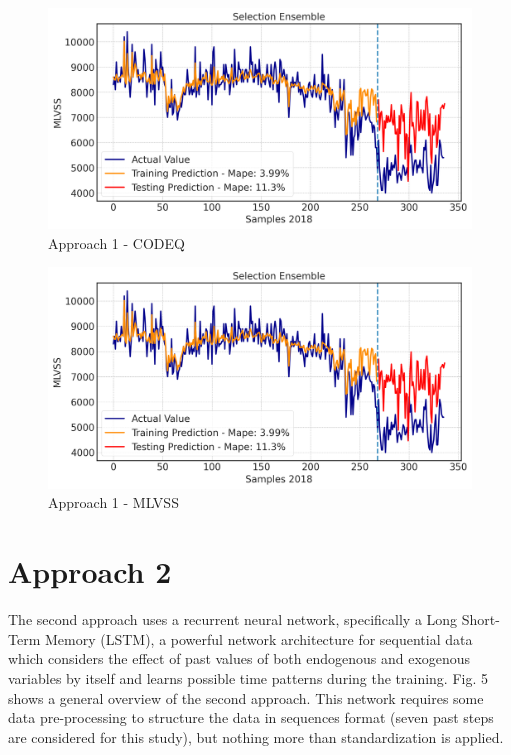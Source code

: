 \begin{figure}[h]
\centering
\includegraphics[width=\linewidth]{figures/test2.png}
\caption{Approach 1 - CODEQ}
\label{f:App1-codeq}
\end{figure}

\begin{figure}[h]
\centering
\includegraphics[width=\linewidth]{figures/test.png}
\caption{Approach 1 - MLVSS}
\label{f:App1-MLVSS}
\end{figure}

\section{Approach 2}
\label{s:Approach2}

The second approach uses a recurrent neural network, specifically a Long Short-Term Memory (LSTM), a powerful network architecture for sequential data which considers the effect of past values of both endogenous and exogenous variables by itself and learns possible time patterns during the training. Fig. 5 shows a general overview of the second approach. This network requires some data pre-processing to structure the data in sequences format (seven past steps are considered for this study), but nothing more than standardization is applied. 

